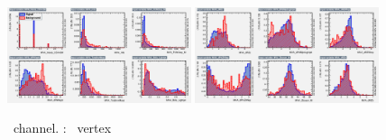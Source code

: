 \begin{figure}[htbp]
	\includegraphics[width=0.48\textwidth]{6_Search/Figures/MVAtechnics/toppairzct/eee/variables_id_c1.png}
	\includegraphics[width=0.48\textwidth]{6_Search/Figures/MVAtechnics/toppairzct/eee/variables_id_c2.png}
	\caption{\eee\ channel. \TTSR: \Zct\ vertex }
	\label{image:Figures3etoppairzct}
\end{figure}

